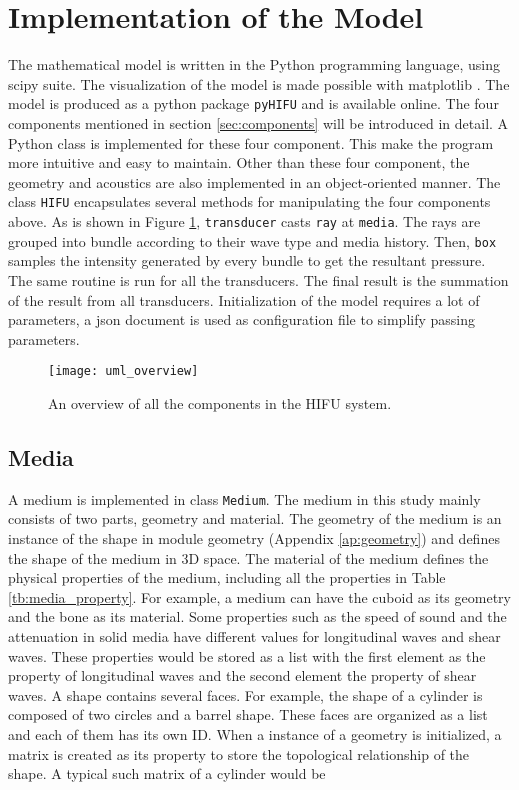 \section{Implementation of the Model} \label{sec:implement}
The mathematical model is written in the Python programming language, using scipy suite\cite{scipy}. The visualization of the model is made possible with matplotlib \cite{matplotlib}. The model is produced as a python package \texttt{pyHIFU} and is available online. The four components mentioned in section \ref{sec:components} will be introduced in detail. A Python class is implemented for these four component. This make the program more intuitive and easy to maintain. Other than these four component, the geometry and acoustics are also implemented in an object-oriented manner. The class \texttt{HIFU} encapsulates several methods for manipulating the four components above. As is shown in Figure \ref{fig:uml_overview}, \texttt{transducer} casts \texttt{ray} at \texttt{media}. The rays are grouped into bundle according to their wave type and media history. Then, \texttt{box} samples the intensity generated by every bundle to get the resultant pressure. The same routine is run for all the transducers. The final result is the summation of the result from all transducers. Initialization of the model requires a lot of parameters, a json document is used as configuration file to simplify passing parameters.

\begin{figure}[h]
    \centering
    \texttt{[image: uml\_overview]}
    \caption{An overview of all the components in the HIFU system.}
    \label{fig:uml_overview}
\end{figure}

\subsection{Media} \label{sec:Media}
A medium is implemented in class \texttt{Medium}. The medium in this study mainly consists of two parts, geometry and material. The geometry of the medium is an instance of the shape in module geometry (Appendix \ref{ap:geometry}) and defines the shape of the medium in 3D space. The material of the medium defines the physical properties of the medium, including all the properties in Table \ref{tb:media_property}. For example, a medium can have the cuboid as its geometry and the bone as its material. Some properties such as the speed of sound and the attenuation in solid media have different values for longitudinal waves and shear waves. These properties would be stored as a list with the first element as the property of longitudinal waves and the second element the property of shear waves. A shape contains several faces. For example, the shape of a cylinder is composed of two circles and a barrel shape. These faces are organized as a list and each of them has its own ID. When a instance of a geometry is initialized, a matrix is created as its property to store the topological relationship of the shape. A typical such matrix of a cylinder would be

